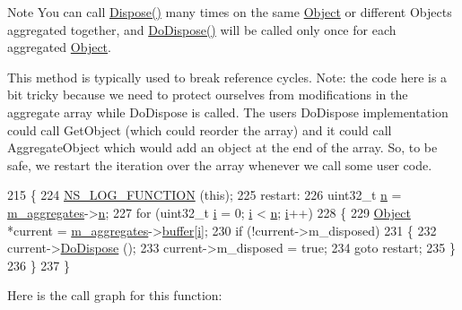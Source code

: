 \begin{DoxyNote}{Note}
You can call \hyperlink{classns3_1_1Object_aa90ae598863f6c251cdab3c3722afdaf}{Dispose()} many times on the same \hyperlink{classns3_1_1Object}{Object} or different Objects aggregated together, and \hyperlink{classns3_1_1Object_a475d429a75d302d4775f4ae32479b287}{Do\+Dispose()} will be called only once for each aggregated \hyperlink{classns3_1_1Object}{Object}.
\end{DoxyNote}
This method is typically used to break reference cycles. Note\+: the code here is a bit tricky because we need to protect ourselves from modifications in the aggregate array while Do\+Dispose is called. The user\textquotesingle{}s Do\+Dispose implementation could call Get\+Object (which could reorder the array) and it could call Aggregate\+Object which would add an object at the end of the array. So, to be safe, we restart the iteration over the array whenever we call some user code.
\begin{DoxyCode}
215 \{
224   \hyperlink{log-macros-disabled_8h_a90b90d5bad1f39cb1b64923ea94c0761}{NS\_LOG\_FUNCTION} (\textcolor{keyword}{this});
225 restart:
226   uint32\_t \hyperlink{namespacesample-rng-plot_aeb5ee5c431e338ef39b7ac5431242e1d}{n} = \hyperlink{classns3_1_1Object_a1f0aff511aa8bbed3f3c3dc9b1d41fe4}{m\_aggregates}->\hyperlink{structns3_1_1Object_1_1Aggregates_a3157f15eafcbf5f0ec5c85d390853829}{n};
227   \textcolor{keywordflow}{for} (uint32\_t \hyperlink{bernuolliDistribution_8m_a6f6ccfcf58b31cb6412107d9d5281426}{i} = 0; \hyperlink{bernuolliDistribution_8m_a6f6ccfcf58b31cb6412107d9d5281426}{i} < \hyperlink{namespacesample-rng-plot_aeb5ee5c431e338ef39b7ac5431242e1d}{n}; \hyperlink{bernuolliDistribution_8m_a6f6ccfcf58b31cb6412107d9d5281426}{i}++)
228     \{
229       \hyperlink{classns3_1_1Object_a40860402e64d8008fb42329df7097cdb}{Object} *current = \hyperlink{classns3_1_1Object_a1f0aff511aa8bbed3f3c3dc9b1d41fe4}{m\_aggregates}->\hyperlink{structns3_1_1Object_1_1Aggregates_ad7680c3fcf46fefedf8ef443e64448be}{buffer}[\hyperlink{bernuolliDistribution_8m_a6f6ccfcf58b31cb6412107d9d5281426}{i}];
230       \textcolor{keywordflow}{if} (!current->m\_disposed)
231         \{
232           current->\hyperlink{classns3_1_1Object_a475d429a75d302d4775f4ae32479b287}{DoDispose} ();
233           current->m\_disposed = \textcolor{keyword}{true};
234           \textcolor{keywordflow}{goto} restart;
235         \}
236     \}
237 \}
\end{DoxyCode}


Here is the call graph for this function\+:




